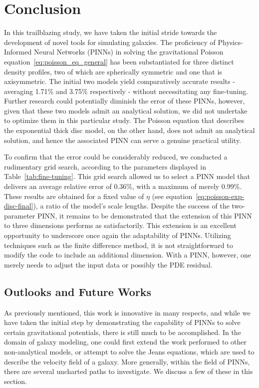 \chapter{Conclusion}\label{ch:conclusion}

In this trailblazing study, we have taken the initial stride towards the development of novel tools for simulating galaxies. The proficiency of Physics-Informed Neural Networks (PINNs) in solving the gravitational Poisson equation~\eqref{eq:poisson_eq_general} has been substantiated for three distinct density profiles, two of which are spherically symmetric and one that is axisymmetric. The initial two models yield comparatively accurate results - averaging 1.71\% and 3.75\% respectively - without necessitating any fine-tuning. Further research could potentially diminish the error of these PINNs, however, given that these two models admit an analytical solution, we did not undertake to optimize them in this particular study. The Poisson equation that describes the exponential thick disc model, on the other hand, does not admit an analytical solution, and hence the associated PINN can serve a genuine practical utility.

To confirm that the error could be considerably reduced, we conducted a rudimentary grid search, according to the parameters displayed in Table~\ref{tab:fine-tuning}. This grid search allowed us to select a PINN model that delivers an average relative error of 0.36\%, with a maximum of merely 0.99\%. These results are obtained for a fixed value of $\eta$ (see equation~\eqref{eq:poisson-exp-disc-final}), a ratio of the model's scale lengths. Despite the success of the two-parameter PINN, it remains to be demonstrated that the extension of this PINN to three dimensions performs as satisfactorily. This extension is an excellent opportunity to underscore once again the adaptability of PINNs. Utilizing techniques such as the finite difference method, it is not straightforward to modify the code to include an additional dimension. With a PINN, however, one merely needs to adjust the input data or possibly the PDE residual.


\section{Outlooks and Future Works}

As previously mentioned, this work is innovative in many respects, and while we have taken the initial step by demonstrating the capability of PINNs to solve certain gravitational potentials, there is still much to be accomplished. In the domain of galaxy modeling, one could first extend the work performed to other non-analytical models, or attempt to solve the Jeans equations, which are used to describe the velocity field of a galaxy. More generally, within the field of PINNs, there are several uncharted paths to investigate. We discuss a few of these in this section.
